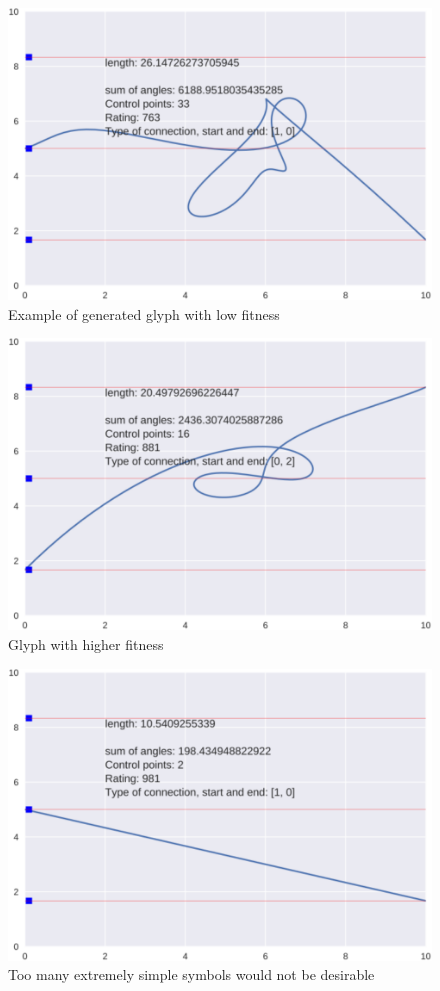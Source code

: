 \documentclass[conference]{IEEEtran}
\begin{document}
\begin{figure}[tbp]
\centering
        \includegraphics[width=0.75\hsize]{e1.pdf}
\caption{Example of generated glyph with low fitness}
\end{figure}
\begin{figure}[tbp]
\centering
        \includegraphics[width=0.75\hsize]{e3.pdf}
\caption{Glyph with higher fitness      }
\end{figure}
\begin{figure}[tbp]
\centering
        \includegraphics[width=0.75\hsize]{e4.pdf}
\caption{Too many extremely simple symbols would not be desirable}
\end{figure}
\end{document}
